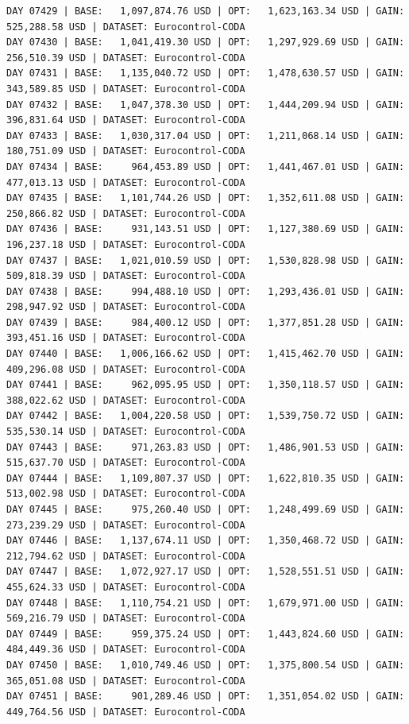 \documentclass[11pt,a4paper]{article}
\begin{document}
\begin{verbatim}
DAY 07429 | BASE:   1,097,874.76 USD | OPT:   1,623,163.34 USD | GAIN: 525,288.58 USD | DATASET: Eurocontrol-CODA
DAY 07430 | BASE:   1,041,419.30 USD | OPT:   1,297,929.69 USD | GAIN: 256,510.39 USD | DATASET: Eurocontrol-CODA
DAY 07431 | BASE:   1,135,040.72 USD | OPT:   1,478,630.57 USD | GAIN: 343,589.85 USD | DATASET: Eurocontrol-CODA
DAY 07432 | BASE:   1,047,378.30 USD | OPT:   1,444,209.94 USD | GAIN: 396,831.64 USD | DATASET: Eurocontrol-CODA
DAY 07433 | BASE:   1,030,317.04 USD | OPT:   1,211,068.14 USD | GAIN: 180,751.09 USD | DATASET: Eurocontrol-CODA
DAY 07434 | BASE:     964,453.89 USD | OPT:   1,441,467.01 USD | GAIN: 477,013.13 USD | DATASET: Eurocontrol-CODA
DAY 07435 | BASE:   1,101,744.26 USD | OPT:   1,352,611.08 USD | GAIN: 250,866.82 USD | DATASET: Eurocontrol-CODA
DAY 07436 | BASE:     931,143.51 USD | OPT:   1,127,380.69 USD | GAIN: 196,237.18 USD | DATASET: Eurocontrol-CODA
DAY 07437 | BASE:   1,021,010.59 USD | OPT:   1,530,828.98 USD | GAIN: 509,818.39 USD | DATASET: Eurocontrol-CODA
DAY 07438 | BASE:     994,488.10 USD | OPT:   1,293,436.01 USD | GAIN: 298,947.92 USD | DATASET: Eurocontrol-CODA
DAY 07439 | BASE:     984,400.12 USD | OPT:   1,377,851.28 USD | GAIN: 393,451.16 USD | DATASET: Eurocontrol-CODA
DAY 07440 | BASE:   1,006,166.62 USD | OPT:   1,415,462.70 USD | GAIN: 409,296.08 USD | DATASET: Eurocontrol-CODA
DAY 07441 | BASE:     962,095.95 USD | OPT:   1,350,118.57 USD | GAIN: 388,022.62 USD | DATASET: Eurocontrol-CODA
DAY 07442 | BASE:   1,004,220.58 USD | OPT:   1,539,750.72 USD | GAIN: 535,530.14 USD | DATASET: Eurocontrol-CODA
DAY 07443 | BASE:     971,263.83 USD | OPT:   1,486,901.53 USD | GAIN: 515,637.70 USD | DATASET: Eurocontrol-CODA
DAY 07444 | BASE:   1,109,807.37 USD | OPT:   1,622,810.35 USD | GAIN: 513,002.98 USD | DATASET: Eurocontrol-CODA
DAY 07445 | BASE:     975,260.40 USD | OPT:   1,248,499.69 USD | GAIN: 273,239.29 USD | DATASET: Eurocontrol-CODA
DAY 07446 | BASE:   1,137,674.11 USD | OPT:   1,350,468.72 USD | GAIN: 212,794.62 USD | DATASET: Eurocontrol-CODA
DAY 07447 | BASE:   1,072,927.17 USD | OPT:   1,528,551.51 USD | GAIN: 455,624.33 USD | DATASET: Eurocontrol-CODA
DAY 07448 | BASE:   1,110,754.21 USD | OPT:   1,679,971.00 USD | GAIN: 569,216.79 USD | DATASET: Eurocontrol-CODA
DAY 07449 | BASE:     959,375.24 USD | OPT:   1,443,824.60 USD | GAIN: 484,449.36 USD | DATASET: Eurocontrol-CODA
DAY 07450 | BASE:   1,010,749.46 USD | OPT:   1,375,800.54 USD | GAIN: 365,051.08 USD | DATASET: Eurocontrol-CODA
DAY 07451 | BASE:     901,289.46 USD | OPT:   1,351,054.02 USD | GAIN: 449,764.56 USD | DATASET: Eurocontrol-CODA

\end{verbatim}
\end{document}
